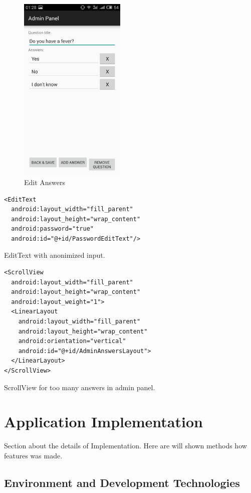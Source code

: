 \documentclass[conference]{IEEEtran}
\begin{document}
\begin{figure}[p!]
  \centering
      \includegraphics[width=2.0in]{./../img/answers.jpg}
  \caption{Edit Answers}
  \label{answers-ss}
\end{figure}

\clearpage

\begin{lstlisting}[frame=single]
<EditText
  android:layout_width="fill_parent"
  android:layout_height="wrap_content"
  android:password="true"
  android:id="@+id/PasswordEditText"/>
\end{lstlisting}
EditText with anonimized input.\\

\begin{lstlisting}[frame=single]
<ScrollView
  android:layout_width="fill_parent"
  android:layout_height="wrap_content"
  android:layout_weight="1">
  <LinearLayout
    android:layout_width="fill_parent"
    android:layout_height="wrap_content"
    android:orientation="vertical"
    android:id="@+id/AdminAnswersLayout">
  </LinearLayout>
</ScrollView>
\end{lstlisting}
ScrollView for too many answers in admin panel.

\section{Application Implementation}

Section about the details of Implementation. Here are will shown methods how features was made.

\subsection{Environment and Development Technologies}
\end{document}

